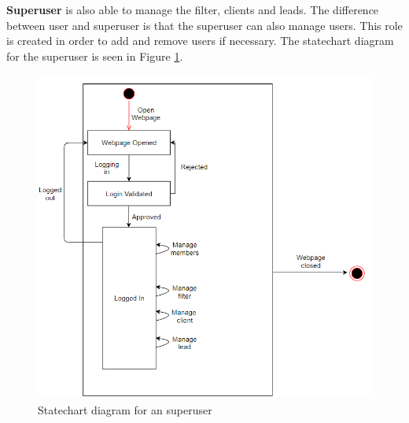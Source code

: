 \noindent
\textbf{Superuser} is also able to manage the filter, clients and leads. The difference between user and superuser is that the superuser can also manage users. This role is created in order to add and remove users if necessary. The statechart diagram for the superuser is seen in Figure \ref{fig:statechartAdmin}.
\begin{figure}[H]
    \centering
    \includegraphics[scale=.7, clip]{figures/useCaseAdmin.png}
    \caption{Statechart diagram for an superuser}
    \label{fig:statechartAdmin}
\end{figure}


